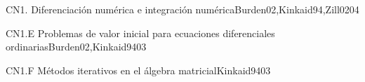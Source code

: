 \begin{syllabus}
   \begin{unit}{CN1. Diferenciación numérica e integración numérica}{}{Burden02,Kinkaid94,Zill02}{0}{4}
   \end{unit}
   
   \begin{unit}{CN1.E Problemas de valor inicial para ecuaciones diferenciales ordinarias}{}{Burden02,Kinkaid94}{0}{3}
   \end{unit}
   
   \begin{unit}{CN1.F Métodos iterativos en el álgebra matricial}{}{Kinkaid94}{0}{3}
   \end{unit}
   
   
   
   \begin{coursebibliography}
   \end{coursebibliography}
   
   \end{syllabus}
   
   